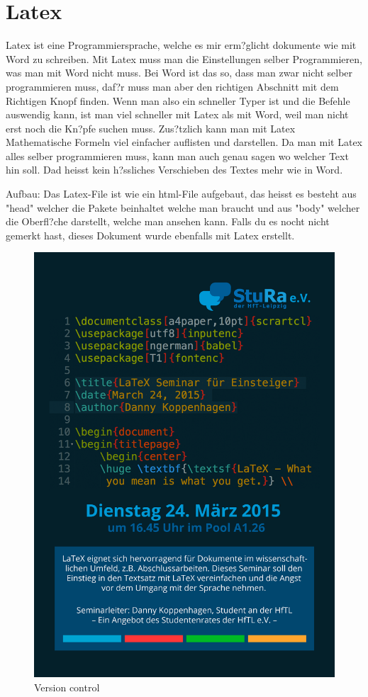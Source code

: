 \documentclass{article}
\begin{document}
\cleardoublepage














\section{Latex}
Latex ist eine Programmiersprache, welche es mir erm?glicht dokumente wie mit Word zu schreiben.
Mit Latex muss man die Einstellungen selber Programmieren, was man mit Word nicht muss.
Bei Word ist das so, dass man zwar nicht selber programmieren muss, daf?r muss man aber den richtigen Abschnitt mit dem Richtigen Knopf finden.
Wenn man also ein schneller Typer ist und die Befehle auswendig kann, ist man viel schneller mit Latex als mit Word, weil man nicht erst noch die Kn?pfe suchen muss.
Zus?tzlich kann man mit Latex Mathematische Formeln viel einfacher auflisten und darstellen.
Da man mit Latex alles selber programmieren muss, kann man auch genau sagen wo welcher Text hin soll.
Dad heisst kein h?ssliches Verschieben des Textes mehr wie in Word.

Aufbau: Das Latex-File ist wie ein html-File aufgebaut, das heisst es besteht aus "head" welcher die Pakete beinhaltet welche man braucht und aus "body"
welcher die Oberfl?che darstellt, welche man ansehen kann.
Falls du es nocht nicht gemerkt hast, dieses Dokument wurde ebenfalls mit Latex erstellt.


\begin{figure}[ht]
    \centering
    \includegraphics[width=.6\linewidth]{latex-plakat}
    \caption{Version control}
    \label{fig:sub1}
    \end{figure}
\end{document}

